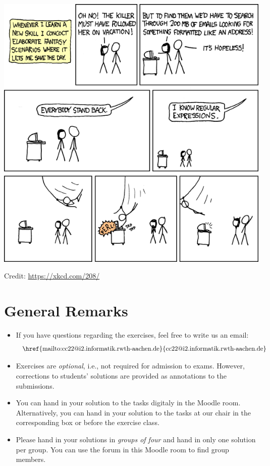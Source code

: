 \documentclass[a4paper]{article}
\begin{document}

\begin{onlysolution}
  \begin{center}
    \includegraphics[scale=0.5]{xkcd_regex}

    \scriptsize Credit: \href{https://xkcd.com/208/}{https://xkcd.com/208/}
  \end{center}
\end{onlysolution}

\section*{General Remarks}
\begin{itemize}
  \item If you have questions regarding the exercises, feel free to write us an email:
  \[\text{   \href{mailto:cc22@i2.informatik.rwth-aachen.de}{cc22@i2.informatik.rwth-aachen.de}}
  \]
  \item Exercises are \emph{optional}, i.e., not required for admission to exams. However, corrections to students’ solutions are provided as annotations to the submissions.
  \item You can hand in your solution to the tasks digitaly in the Moodle room. Alternatively, you can hand in your solution to the tasks at our chair in the corresponding box or before the exercise class.
  \item Please hand in your solutions in \emph{groups of four} and hand in only one solution per group. You can use the forum in this Moodle room to find group members.
\end{itemize}



%
\end{document}
